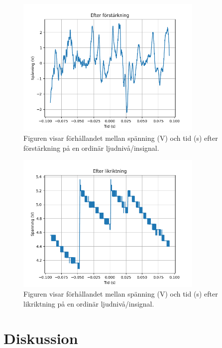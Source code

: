 \documentclass[12pt]{report}
\begin{document}
\setcounter{figure}{1}

\begin{figure}[ht]
  \centering
  \includegraphics[width=0.8\textwidth]{bilder/efter.png}
  \caption{Figuren visar förhållandet mellan spänning (V) och tid (s) efter förstärkning på en ordinär ljudnivå/insignal.}
  \label{fig:efterf}
\end{figure}

\begin{figure}[ht]
  \label{fig:lik}
  \centering
  \includegraphics[width=0.8\textwidth]{bilder/lik.png}
  \caption{Figuren visar förhållandet mellan spänning (V) och tid (s) efter likriktning på en ordinär ljudnivå/insignal.}
\end{figure}

\chapter{Diskussion}
\label{chap:disc}
\end{document}

